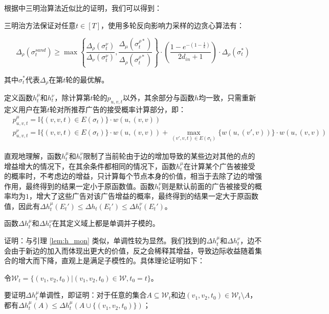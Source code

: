 根据\parencite{sandwich}中三明治算法近似比的证明，我们可以得到：

\begin{theorem}
\label{thm:sand}
三明治方法保证对任意$t \in [T]$，使用多轮反向影响力采样的边贪心算法有：

\begin{equation}
    \Delta_\rho(\sigma_t^{sand}) \ge \max\left\{\frac{\Delta_\rho(\sigma_t^\nu)}{\Delta_\nu(\sigma_t^\nu)},\frac{\Delta_\mu(\sigma_t^{\rho*})}{\Delta_\rho(\sigma_t^{\rho*})} \right\} \cdot (\frac{1-e^{-(1-\frac{1}{k})}}{2d_{in}+1})\cdot \Delta_\rho(\sigma_t^{*})
\end{equation}
\end{theorem}

\noindent 其中$\sigma_t^{*}$代表$\Delta_\rho$在第$t$轮的最优解。

定义函数$h_t^\mu$和$h_t^\nu$，除计算第$t$轮的$p_{u,v,t}$以外，其余部分与函数$h$均一致，只需重新定义用户在第$t$轮对所推荐广告的接受概率计算部分，即：
\begin{align}
    &p_{u,v,t}^\mu=\mathbb{I}\{(v,v,t)\in E(\sigma_t)\}\cdot w(u,(v,v)) \label{equ:def_mu}\\
    &p_{u,v,t}^\nu=\mathbb{I}\{(v,v,t)\in E(\sigma_t)\}\cdot w(u,(v,v)) + \max_{(v',v,t)\in E(\sigma_t)}\{w(u,(v',v))\}\cdot w(u,(v,v)) \label{equ:def_nu}
\end{align}

直观地理解，函数$h_t^\mu$和$h_t^\nu$限制了当前轮由于边的增加导致的某些边对其他的点的增益增大的情况下，在其余条件都相同的情况下，函数$h_t^\mu$在计算某个广告被接受的概率时，不考虑边的增益，只计算每个节点本身的价值，相当于去除了边的增强作用，最终得到的结果一定小于原函数值。函数$h_t^\nu$则是默认前面的广告被接受的概率均为$1$，增大了这些广告对该广告增益的概率，最终得到的结果一定大于原函数值，因此有$\Delta h_t^\mu(E_t') \le \Delta h_t(E_t') \le \Delta h_t^\nu(E_t')$。

\begin{lemma}
\label{lem:mon_sub}
函数$\Delta h_t^\mu$和$ \Delta h_t^\nu$在其定义域上都是单调并子模的。
\end{lemma}

\noindent 证明：与引理 \ref{lem:h_mon} 类似，单调性较为显然。我们找到的$\Delta h_t^\mu$和$ \Delta h_t^\nu$，边不会由于新边的加入而体现出更大的价值，反之会稀释其增益，导致边际收益随着集合的增大而下降，直观上是满足子模性的。具体理论证明如下：

令$\mathcal{W}_t=\{(v_1,v_2,t_0) |(v_1,v_2,t_0) \in \mathcal{W},t_0=t\}$。

要证明$\Delta h_t^\mu$单调性，即证明：对于任意的集合$A \subseteq \mathcal{W}_t$和边$(v_1,v_2,t_0) \in \mathcal{W}_t\setminus A$，都有$\Delta h_t^\mu(A)\le \Delta h_t^\mu(A\cup\{(v_1,v_2,t_0)\})$；

